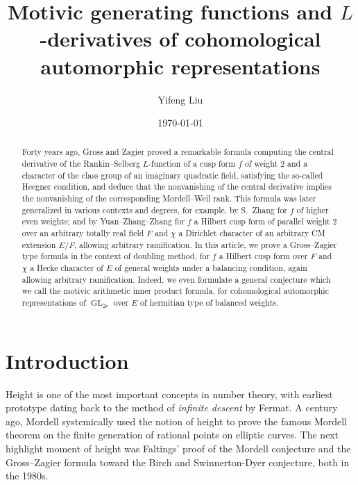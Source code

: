 \documentclass[12pt]{amsart}
\numberwithin{equation}{section}
\theoremstyle{plain}
\theoremstyle{definition}
\theoremstyle{remark}
\renewcommand{\(}{\left(}
\renewcommand{\)}{\right)}
\DeclareMathOperator{\GL}{GL}
\begin{document}
\title[Motivic generating functions and $L$-derivatives]
{Motivic generating functions and $L$-derivatives of cohomological automorphic representations}


\author{Yifeng Liu}
\address{Institute for Advanced Study in Mathematics, Zhejiang University, Hangzhou 310058, China}

\date{\today}


\begin{abstract}
  Forty years ago, Gross and Zagier proved a remarkable formula computing the central derivative of the Rankin--Selberg $L$-function of a cusp form $f$ of weight $2$ and a character of the class group of an imaginary quadratic field, satisfying the so-called Heegner condition, and deduce that the nonvanishing of the central derivative implies the nonvanishing of the corresponding Mordell--Weil rank. This formula was later generalized in various contexts and degrees, for example, by S.~Zhang for $f$ of higher even weights; and by Yuan--Zhang--Zhang for $f$ a Hilbert cusp form of parallel weight $2$ over an arbitrary totally real field $F$ and $\chi$ a Dirichlet character of an arbitrary CM extension $E/F$, allowing arbitrary ramification. In this article, we prove a Gross--Zagier type formula in the context of doubling method, for $f$ a Hilbert cusp form over $F$ and $\chi$ a Hecke character of $E$ of general weights under a balancing condition, again allowing arbitrary ramification. Indeed, we even formulate a general conjecture which we call the motivic arithmetic inner product formula, for cohomological automorphic representations of $\GL_{2r}$ over $E$ of hermitian type of balanced weights.
\end{abstract}



\maketitle

\tableofcontents




\section{Introduction}



Height is one of the most important concepts in number theory, with earliest prototype dating back to the method of \emph{infinite descent} by Fermat. A century ago, Mordell systemically used the notion of height to prove the famous Mordell theorem on the finite generation of rational points on elliptic curves. The next highlight moment of height was Faltings' proof of the Mordell conjecture and the Gross--Zagier formula toward the Birch and Swinnerton-Dyer conjecture, both in the 1980s.
\end{document}
